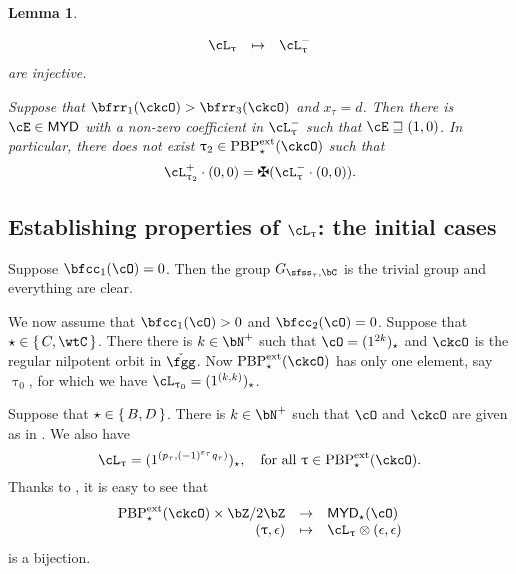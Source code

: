 \documentclass[12pt,a4paper]{amsart}
\def\MYD{{\mathsf{MYD}}}
\numberwithin{equation}{section}
\newtheorem{lem}[thm]{Lemma}
\theoremstyle{remark}
\def\PBPes{\mathrm{PBP}^{\mathrm{ext}}_{\star}}
\begin{document}
\begin{lem}
\begin{enuma}
\[\begin{array}{rcl}
       \ac_{\uptau} &\mapsto & \nac{\uptau}
     \end{array}
   \]
    are injective.
    \item Suppose that $\bfrr_{1}(\ckcO)> \bfrr_{3}(\ckcO)$ and $x_{\tau}=d$.
    Then there is $\cE\in \MYD$ with a non-zero coefficient in $\nac{\uptau}$ such that $\cE\sqsupseteq (1,0)$.
    In particular, there does not exist $\uptau_2\in \PBPes(\ckcO)$ such that
    \begin{equation}\label{eq:pnac}
     \pac{\uptau_2} \cdot (0,0) = \maltese (\nac{\uptau}\cdot (0,0)).
    \end{equation}
  \end{enuma}
\end{lem}


\subsection{Establishing properties of $\ac_{\uptau}$: the initial cases}
\label{sec:init}
Suppose $\bfcc_{1}(\cO)=0$.
Then the group $G_{\sfss_\tau,\bC}$ is the trivial group and everything are
clear.

\smallskip

We now assume that $\bfcc_{1}(\cO)>0$ and $\bfcc_{2}(\cO)=0$. Suppose that
$\star \in \set{C,\wtC}$.
There there is $k\in\bN^{+}$ such that $\cO =
(1^{2k})_{\star}$ and $\ckcO$ is the regular nilpotent orbit in $\ckfgg$.
Now $\PBPes(\ckcO)$ has only one element, say $\uptau_{0}$, for which
we have $\ac_{\uptau_{0}} = (1^{(k,k)})_{\star}$.

\smallskip

Suppose that $\star \in \set{B,D}$.
There is $k\in \bN^{+}$ such that
$\cO$ and $\ckcO$ are given as in .
We also have
\[
  \ac_{\uptau} = (1^{(p_{\tau},(-1)^{\varepsilon_{\tau}}q_{\tau})})_{\star},
  \quad  \Forall \uptau\in \PBPes(\ckcO).
\]
Thanks to , it is easy to see that
\[
  \begin{array}{rcl}
    \PBPes(\ckcO)\times \bZ/2\bZ & \rightarrow & \MYD_{\star}(\cO)\\
    (\uptau,\epsilon) & \mapsto & \ac_{\uptau}\otimes (\epsilon,\epsilon)
  \end{array}
\]
is a bijection.
\end{document}
